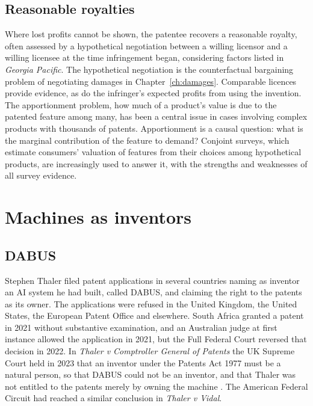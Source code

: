 \subsection{Reasonable royalties}

Where lost profits cannot be shown, the patentee recovers a reasonable royalty, often assessed by a hypothetical negotiation between a willing licensor and a willing licensee at the time infringement began, considering factors listed in \emph{Georgia Pacific}. The hypothetical negotiation is the counterfactual bargaining problem of negotiating damages in Chapter~\ref{ch:damages}. Comparable licences provide evidence, as do the infringer's expected profits from using the invention. The apportionment problem, how much of a product's value is due to the patented feature among many, has been a central issue in cases involving complex products with thousands of patents. Apportionment is a causal question: what is the marginal contribution of the feature to demand? Conjoint surveys, which estimate consumers' valuation of features from their choices among hypothetical products, are increasingly used to answer it, with the strengths and weaknesses of all survey evidence.

\section{Machines as inventors}

\subsection{DABUS}

Stephen Thaler filed patent applications in several countries naming as inventor an AI system he had built, called DABUS, and claiming the right to the patents as its owner. The applications were refused in the United Kingdom, the United States, the European Patent Office and elsewhere. South Africa granted a patent in 2021 without substantive examination, and an Australian judge at first instance allowed the application in 2021, but the Full Federal Court reversed that decision in 2022. In \emph{Thaler v Comptroller General of Patents} the UK Supreme Court held in 2023 that an inventor under the Patents Act 1977 must be a natural person, so that DABUS could not be an inventor, and that Thaler was not entitled to the patents merely by owning the machine \citep{thaler2023}. The American Federal Circuit had reached a similar conclusion in \emph{Thaler v Vidal}.

